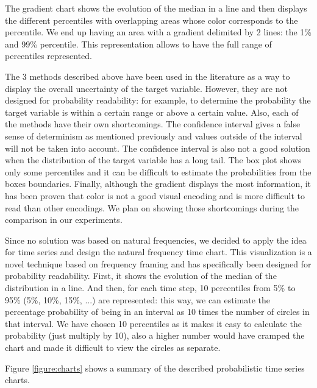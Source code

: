 \documentclass[a4paper,3p,sort&compress]{elsarticle}
\begin{document}
The gradient chart shows the evolution of the median in a line and then displays the different percentiles
with overlapping areas whose color corresponds to the percentile. We end up having an area with a gradient 
delimited by 2 lines: the 1\% and 99\% percentile. This representation allows to have the
 full range of percentiles represented.

The 3 methods described above have been used in the literature as a way to display the overall uncertainty 
of the target variable. However, they are not designed for probability readability: for example, to determine 
the probability the target variable is within a certain range or above a certain value. Also,
each of the methods have their own shortcomings. The confidence interval gives a false sense of determinism as mentioned previously
and values outside of the interval will not be taken into account. The confidence interval is also not a good solution 
when the distribution of the target variable has a long tail. The box plot shows only some percentiles and it can be difficult to 
estimate the probabilities from the boxes boundaries. Finally, although the gradient displays the most information, it has been 
proven that color is not 
a good visual encoding and is more difficult to read than other encodings. We plan on showing those shortcomings during the comparison in our experiments.

Since no solution was based on natural frequencies, we decided to apply the idea for time series and design the natural frequency time chart.
This visualization is a novel technique based on frequency framing and has 
specifically been designed for probability readability. First, 
it shows the evolution of the median of the distribution in a line. And then, for each time 
step, 10 percentiles from 5\% to 95\% (5\%, 10\%, 15\%, ...) are represented: this way, we can estimate the percentage 
probability of being in an interval as 10 times the number of circles in that interval. 
We have chosen 10 percentiles as it makes it easy to calculate the probability (just multiply by 10), also a higher number
would have cramped the chart and made it difficult to view the circles as separate. 

Figure \ref{figure:charts} shows a summary of the described probabilistic time series charts.
\end{document}
